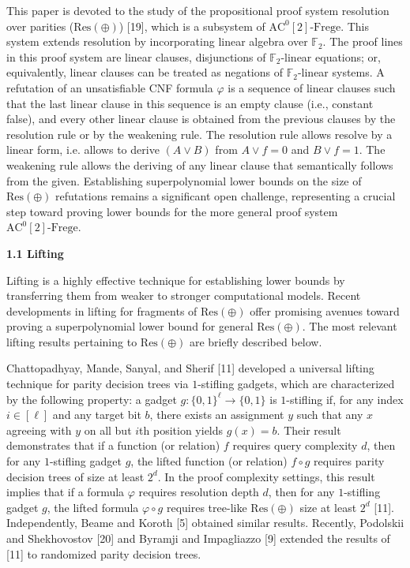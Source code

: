 This paper is devoted to the study of the propositional proof system resolution over parities ($\mathrm{Res}(\oplus)$) [19], which is a subsystem of $\mathrm{AC}^{0}[2]\text{-}\mathrm{Frege}$. This system extends resolution by incorporating linear algebra over $\mathbb{F}_{2}$. The proof lines in this proof system are linear clauses, disjunctions of $\mathbb{F}_{2}$-linear equations; or, equivalently, linear clauses can be treated as negations of $\mathbb{F}_{2}$-linear systems. A refutation of an unsatisfiable CNF formula $\varphi$ is a sequence of linear clauses such that the last linear clause in this sequence is an empty clause (i.e., constant false), and every other linear clause is obtained from the previous clauses by the resolution rule or by the weakening rule. The resolution rule allows resolve by a linear form, i.e. allows to derive $(A\lor B)$ from $A\lor f=0$ and $B\lor f=1$. The weakening rule allows the deriving of any linear clause that semantically follows from the given. Establishing superpolynomial lower bounds on the size of $\mathrm{Res}(\oplus)$ refutations remains a significant open challenge, representing a crucial step toward proving lower bounds for the more general proof system $\mathrm{AC}^{0}[2]\text{-}\mathrm{Frege}$.\par


\par\medskip\noindent\textbf{
1.1 Lifting}\par


Lifting is a highly effective technique for establishing lower bounds by transferring them from weaker to stronger computational models. Recent developments in lifting for fragments of $\mathrm{Res}(\oplus)$ offer promising avenues toward proving a superpolynomial lower bound for general $\mathrm{Res}(\oplus)$. The most relevant lifting results pertaining to $\mathrm{Res}(\oplus)$ are briefly described below.\par



Chattopadhyay, Mande, Sanyal, and Sherif [11] developed a universal lifting technique for parity decision trees
via $1$-stifling gadgets, which are characterized by the following property: a gadget $g\colon\{0,1\}^{\ell}\to\{0,1\}$ is $1$-stifling if, for any index $i\in[\ell]$ and any target bit $b$, there exists an assignment $y$ such that any $x$ agreeing with $y$ on all but $i$th position yields $g(x)=b$.
Their result demonstrates that if a function (or relation) $f$ requires query complexity $d$, then for any $1$-stifling gadget $g$, the lifted function (or relation) $f\circ g$ requires parity decision trees of size at least $2^{d}$. In the proof complexity settings, this result implies that if a
formula $\varphi$ requires resolution depth $d$, then for any $1$-stifling gadget $g$, the lifted formula $\varphi\circ g$ requires tree-like $\mathrm{Res}(\oplus)$ size at least $2^{d}$ [11]. Independently, Beame and Koroth [5] obtained similar results. Recently, Podolskii and Shekhovostov [20] and Byramji and Impagliazzo [9] extended the results of [11] to randomized parity decision trees.\par



